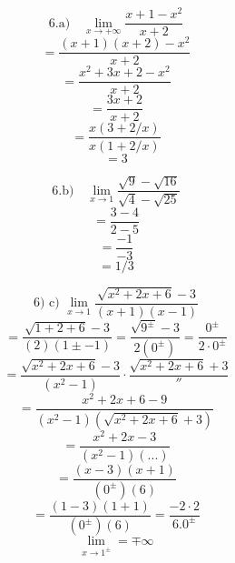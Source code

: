 \documentclass{article}
\begin{document}
\[ \text{6.a)} \quad \lim_{x \to +\infty} \frac{x+1-x^2}{x+2} \]
\[ = \frac{(x+1)(x+2)-x^2}{x+2} \]
\[ = \frac{x^2+3x+2-x^2}{x+2} \]
\[ = \frac{3x+2}{x+2} \]
\[ = \frac{x(3+2/x)}{x(1+2/x)} \]
\[ = 3  \]

\[ \text{6.b)} \quad \lim_{x \to 1} \frac{\sqrt{9}-\sqrt{16}}{\sqrt{4}-\sqrt{25}} \]
\[ = \frac{3-4}{2-5} \]
\[ = \frac{-1}{-3} \]
\[ = 1/3 \]

\[ \text{6) c) } \lim_{x \to 1} \frac{\sqrt{x^2+2x+6}-3}{(x+1)(x-1)} \]
\[ = \frac{\sqrt{1+2+6}-3}{(2)(1\pm-1)} = \frac{\sqrt{9^\pm}-3}{2(0^\pm)} = \frac{0^\pm}{2\cdot0^\pm} \]
\[ = \frac{\sqrt{x^2+2x+6}-3}{(x^2-1)} \cdot \frac{\sqrt{x^2+2x+6}+3}{''} \]
\[ = \frac{x^2+2x+6-9}{(x^2-1)(\sqrt{x^2+2x+6}+3)} \]
\[ = \frac{x^2+2x-3}{(x^2-1)(...)} \]
\[ = \frac{(x-3)(x+1)}{(0^\pm)(6)} \]
\[ = \frac{(1-3)(1+1)}{(0^\pm)(6)} = \frac{-2 \cdot 2}{6.0^\pm} \]
\[ \lim_{x \to 1^\pm} = \mp \infty \]
\end{document}
